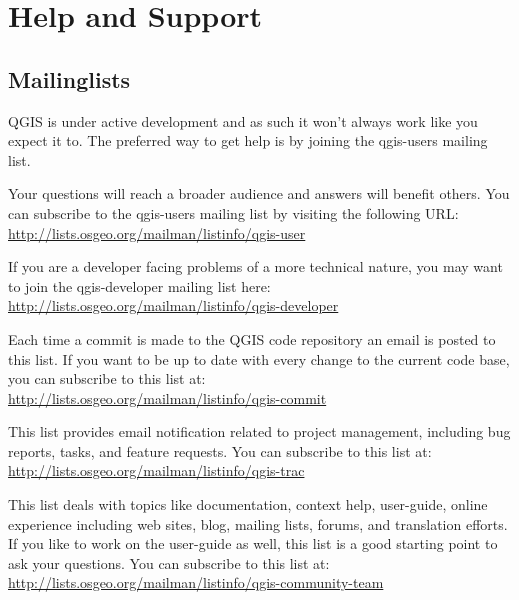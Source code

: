 
\section{Help and Support}\label{label_helpsupport}


\subsection{Mailinglists}
QGIS is under active development and as such it won't always work like
you expect it to. The preferred way to get help is by joining the qgis-users
mailing list. 

Your questions will reach a broader audience and answers will
benefit others. You can subscribe to the qgis-users mailing list by visiting
the following URL: \\
\url{http://lists.osgeo.org/mailman/listinfo/qgis-user}

If you are a developer facing problems of a more technical nature, you may
want to join the qgis-developer mailing list here:\\
\url{http://lists.osgeo.org/mailman/listinfo/qgis-developer}

Each time a commit is made to the QGIS code repository an email is posted to
this list. If you want to be up to date with every change to the current code
base, you can subscribe to this list at:\\
\url{http://lists.osgeo.org/mailman/listinfo/qgis-commit}

This list provides email notification related to project management,
including bug reports, tasks, and feature requests. You can subscribe to this
list at:\\
\url{http://lists.osgeo.org/mailman/listinfo/qgis-trac}

This list deals with topics like documentation, context help, user-guide,
online experience including web sites, blog, mailing lists, forums, and
translation efforts. If you like to work on the user-guide as well, this list
is a good starting point to ask your questions. You can subscribe to this
list at:\\
\url{http://lists.osgeo.org/mailman/listinfo/qgis-community-team}

